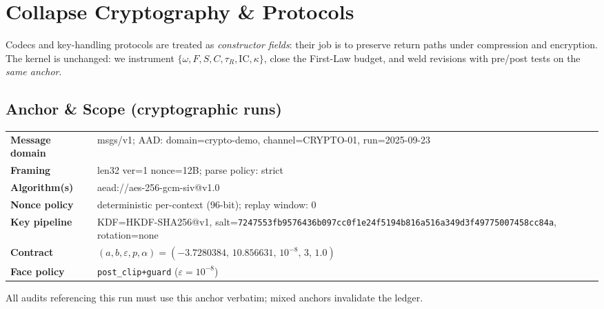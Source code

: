 \chapter{Collapse Cryptography \& Protocols}
\label{ch:crypto}

Codecs and key-handling protocols are treated as \emph{constructor fields}: their job is to preserve return paths under compression and encryption. The kernel is unchanged: we instrument \(\{\omega,F,S,C,\tau_{R},\mathrm{IC},\kappa\}\), close the First-Law budget, and weld revisions with pre/post tests on the \emph{same anchor}.

\section{Anchor \& Scope (cryptographic runs)}
\label{sec:crypto-anchor}

\begin{eqbox}
\small

\begingroup
\def\UrlBreaks{\do\0\do\1\do\2\do\3\do\4\do\5\do\6\do\7\do\8\do\9%
  \do\a\do\b\do\c\do\d\do\e\do\f\do\A\do\B\do\C\do\D\do\E\do\F}
\def\UrlFont{\ttfamily\small}
\setlength{\tabcolsep}{6pt}

\begin{tabularx}{\linewidth}{@{} >{\bfseries}l >{\raggedright\arraybackslash}X @{}}
Message domain & msgs/v1; AAD: domain=crypto-demo, channel=CRYPTO-01, run=2025-09-23 \\
Framing        & len32 \textbar{} ver=1 \textbar{} nonce=12B; parse policy: strict \\
Algorithm(s)   & aead://aes-256-gcm-siv@v1.0 \\
Nonce policy   & deterministic per-context (96-bit); replay window: 0 \\
Key pipeline   & KDF=HKDF-SHA256@v1, salt=\nolinkurl{7247553fb9576436b097cc0f1e24f5194b816a516a349d3f49775007458cc84a}, rotation=none \\
Contract       & $(a,b,\varepsilon,p,\alpha)=(-3.7280384,\,10.856631,\,10^{-8},\,3,\,1.0)$ \\
Face policy    & \texttt{post\_clip+guard} (\(\varepsilon=10^{-8}\)) \\
\end{tabularx}
\endgroup

\vspace{0.2\baselineskip}
\raggedright\footnotesize
All audits referencing this run must use this anchor verbatim; mixed anchors invalidate the ledger.
\end{eqbox}

